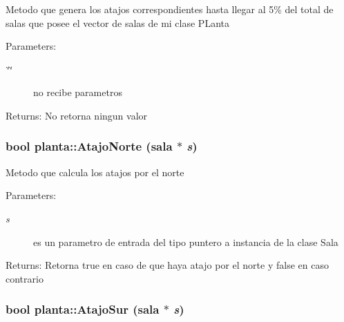 Metodo que genera los atajos correspondientes hasta llegar al 5\% del total de salas que posee el vector de salas de mi clase PLanta \begin{Desc}
\item[Parameters:]
\begin{description}
\item[{\em \char`\"{}\char`\"{}}]no recibe parametros \end{description}
\end{Desc}
\begin{Desc}
\item[Returns:]No retorna ningun valor \end{Desc}
\hypertarget{classplanta_894574ebadf95dc0fd29a692f4c8e563}{
\subsubsection[AtajoNorte]{\setlength{\rightskip}{0pt plus 5cm}bool planta::AtajoNorte ({\bf sala} $\ast$ {\em s})}}
\label{classplanta_894574ebadf95dc0fd29a692f4c8e563}


Metodo que calcula los atajos por el norte \begin{Desc}
\item[Parameters:]
\begin{description}
\item[{\em s}]es un parametro de entrada del tipo puntero a instancia de la clase Sala \end{description}
\end{Desc}
\begin{Desc}
\item[Returns:]Retorna true en caso de que haya atajo por el norte y false en caso contrario \end{Desc}
\hypertarget{classplanta_6f30a6db1b7f9796a8608348bb438efb}{
\subsubsection[AtajoSur]{\setlength{\rightskip}{0pt plus 5cm}bool planta::AtajoSur ({\bf sala} $\ast$ {\em s})}}
\label{classplanta_6f30a6db1b7f9796a8608348bb438efb}


